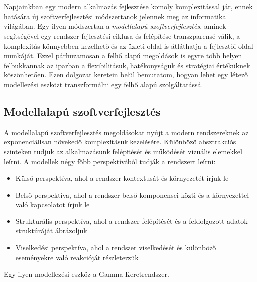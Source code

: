 \chapter{\bevezetes}

Napjainkban egy modern alkalmazás fejlesztése komoly komplexitással jár, ennek hatására új szoftverfejlesztési módszertanok jelennek meg az informatika világában. Egy ilyen módszertan a \textit{modellalapú szoftverfejlesztés}, aminek segítségével egy rendszer fejlesztési ciklusa és felépítése transzparensé válik, a komplexitás könnyebben kezelhető és az üzleti oldal is átláthatja a fejlesztői oldal munkáját. Ezzel párhuzamosan a felhő alapú megoldások is egyre több helyen felbukkannak az iparban a flexibilitásuk, hatékonyságuk és stratégiai értéküknek köszönhetően. Ezen dolgozat keretein belül bemutatom, hogyan lehet egy létező modellezési eszközt transzformálni egy felhő alapú szolgáltatássá.
\section{Modellalapú szoftverfejlesztés}

A modellalapú szoftverfejlesztés megoldásokat nyújt a modern rendszereknek az exponenciálisan növekedő komplexitásuk kezelésére. Különböző absztrakciós szinteken tudjuk az alkalmazásunk felépítését és működését vizuális elemekkel leírni. A modellek négy főbb perspektívából tudják a rendszert leírni\cite{cs1}:

 \begin{itemize}
 	\item Külső perspektíva, ahol a rendszer kontextusát és környezetét írjuk le
 	\item Belső perspektíva, ahol a rendszer belső komponensei közti és a környezettel való kapcsolatot írjuk le
 	\item Strukturális perspektíva, ahol a rendszer felépítését és a feldolgozott adatok struktúráját ábrázoljuk
 	\item Viselkedési perspektíva, ahol a rendszer viselkedését és különböző eseményekre való reakcióját részletezzük
 \end{itemize}
Egy ilyen modellezési eszköz a Gamma Keretrendszer.
